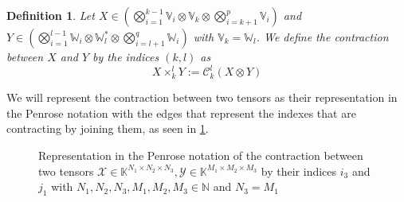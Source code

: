 \documentclass[11pt,a4paper,openright,oneside]{book}
\numberwithin{equation}{section}
\newtheorem{defn0}{Definition}[chapter]
\newenvironment{definition}{ \begin{defn0}}{\end{defn0}}
\newcommand{\figref}[1]{\cref{#1}}
\begin{document}
\begin{definition}

    Let $X \in \left( \bigotimes_{i=1}^{k-1} \mathbb{V}_i \otimes \mathbb{V}_k \otimes \bigotimes_{i=k+1}^{p} \mathbb{V}_i \right)$ and
    $Y \in \left( \bigotimes_{i=1}^{l-1} \mathbb{W}_{i} \otimes \mathbb{W}_l^* \otimes 
    \bigotimes_{i=l+1}^q \mathbb{W}_i \right)$ with $\mathbb{V}_k = \mathbb{W}_l$. We define the contraction between $X$ and $Y$ by the
    indices $(k,l)$ as $$X \times^l_k Y := \mathcal{C}_k^l(X \otimes Y)$$
\end{definition}

We will represent the contraction between two tensors 
as their representation in the Penrose notation with the edges that represent the indexes that are contracting by joining them, as seen in \figref{fig:tencon}.


\begin{figure}
    \begin{center}
    \hfill
\begin{minipage}{0.2\textwidth}
\end{minipage}
\hfill
\begin{minipage}{0.225\textwidth}
\end{minipage}
\hfill
\begin{minipage}{0.225\textwidth}
\end{minipage}
\end{center}

\caption{
    Representation in the Penrose notation of the contraction between two tensors $\mathcal{X} \in \mathbb{K}^{N_1 \times N_2 \times N_3}, \mathcal{Y} \in \mathbb{K}^{M_1 \times M_2 \times M_3}$
    by their indices $i_3$ and $j_1$ with $N_1, N_2, N_3, M_1, M_2, M_3 \in \mathbb{N}$ and $N_3 = M_1$
}
\label{fig:tencon}
\end{figure}
\end{document}
